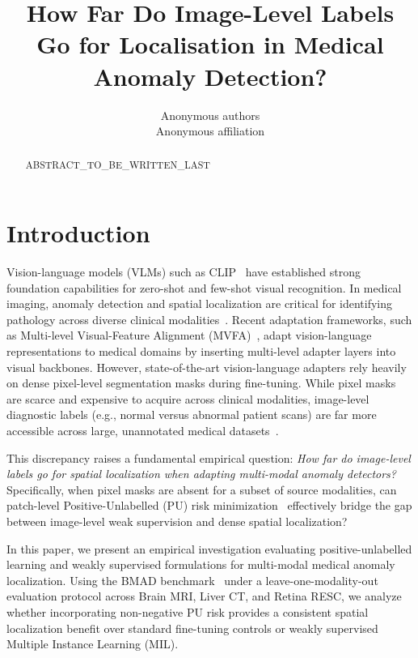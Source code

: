 \documentclass[10pt,twocolumn,letterpaper]{article}
\title{How Far Do Image-Level Labels Go for Localisation in Medical Anomaly Detection?}
\author{Anonymous authors\\Anonymous affiliation}
\begin{document}
\maketitle
\begin{abstract}
ABSTRACT_TO_BE_WRITTEN_LAST
\end{abstract}

\section{Introduction}
\label{sec:intro}
Vision-language models (VLMs) such as CLIP~\cite{clip2021} have established strong foundation capabilities for zero-shot and few-shot visual recognition. In medical imaging, anomaly detection and spatial localization are critical for identifying pathology across diverse clinical modalities~\cite{medicalad_survey2021}. Recent adaptation frameworks, such as Multi-level Visual-Feature Alignment (MVFA)~\cite{huang2024mvfa}, adapt vision-language representations to medical domains by inserting multi-level adapter layers into visual backbones. However, state-of-the-art vision-language adapters rely heavily on dense pixel-level segmentation masks during fine-tuning. While pixel masks are scarce and expensive to acquire across clinical modalities, image-level diagnostic labels (e.g., normal versus abnormal patient scans) are far more accessible across large, unannotated medical datasets~\cite{bmad2024}.

This discrepancy raises a fundamental empirical question: \emph{How far do image-level labels go for spatial localization when adapting multi-modal anomaly detectors?} Specifically, when pixel masks are absent for a subset of source modalities, can patch-level Positive-Unlabelled (PU) risk minimization~\cite{elkan2008pu, kiryo2017nnpu} effectively bridge the gap between image-level weak supervision and dense spatial localization?

In this paper, we present an empirical investigation evaluating positive-unlabelled learning and weakly supervised formulations for multi-modal medical anomaly localization. Using the BMAD benchmark~\cite{bmad2024} under a leave-one-modality-out evaluation protocol across Brain MRI, Liver CT, and Retina RESC, we analyze whether incorporating non-negative PU risk provides a consistent spatial localization benefit over standard fine-tuning controls or weakly supervised Multiple Instance Learning (MIL).
\end{document}
